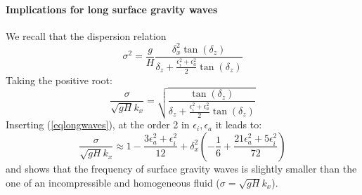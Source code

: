 \paragraph{Implications for long surface gravity waves}
We recall that the dispersion relation
\[
\sigma^2=\frac{g}{H}\frac{\delta_x^2\tan(\delta_z)}{\delta_z+\frac{\epsilon_i^2+\epsilon_a^2}{2}\tan(\delta_z)}
\]
Taking the positive root:
\[
\frac{\sigma}{\sqrt{gH}k_x}=\sqrt{\frac{\tan(\delta_z)}{\delta_z+\frac{\epsilon_i^2+\epsilon_a^2}{2}\tan(\delta_z)}}
\]
Inserting (\ref{eqlongwaves}), at the order 2 in $\epsilon_i, \epsilon_a$ it leads to:
\[
\frac{\sigma}{\sqrt{gH}k_x}\approx 1-\frac{3\epsilon_a^2+\epsilon_i^2}{12}
+\delta_x^2\left(
-\frac{1}{6}+\frac{21\epsilon_a^2+5\epsilon_i^2}{72}
\right)
\]
and shows that the frequency of surface gravity waves is slightly smaller than the one of an incompressible and homogeneous fluid ($\sigma=\sqrt{gH}k_x$).
\\
\newpage
